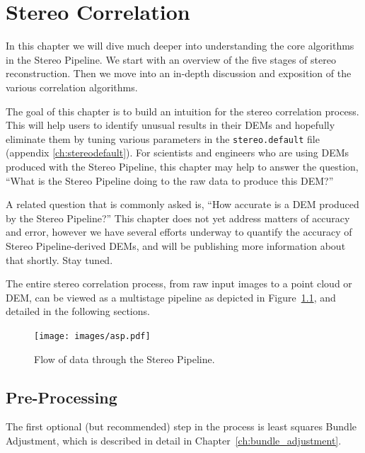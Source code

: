 \chapter{Stereo Correlation}
\label{ch:correlation}

In this chapter we will dive much deeper into understanding the core
algorithms in the Stereo Pipeline.  We start with an overview of the
five stages of stereo reconstruction.  Then we move into an in-depth
discussion and exposition of the various correlation algorithms.

The goal of this chapter is to build an intuition for the stereo
correlation process.  This will help users to identify unusual results
in their \acp{DEM} and hopefully eliminate them by tuning various
parameters in the \texttt{stereo.default} file (appendix
\ref{ch:stereodefault}).  For scientists and
engineers who are using \acp{DEM} produced with the Stereo Pipeline, this
chapter may help to answer the question, ``What is the Stereo Pipeline
doing to the raw data to produce this \ac{DEM}?''

A related question that is commonly asked is, ``How accurate is a \ac{DEM}
produced by the Stereo Pipeline?''  This chapter does not yet address
matters of accuracy and error, however we have several efforts underway
to quantify the accuracy of Stereo Pipeline-derived \acp{DEM}, and will be
publishing more information about that shortly.  Stay tuned.

The entire stereo correlation process, from raw input images to a
point cloud or DEM, can be viewed as a multistage pipeline as depicted
in Figure~\ref{fig:asp}, and detailed in the following sections.

\begin{figure}[tb]
  \centering
  \texttt{[image: images/asp.pdf]}
  \caption{Flow of data through the Stereo Pipeline.}
  \label{fig:asp}
\end{figure}

\section{Pre-Processing}

The first optional (but recommended) step in the process is least
squares Bundle Adjustment, which is described in detail in
Chapter~\ref{ch:bundle_adjustment}.

